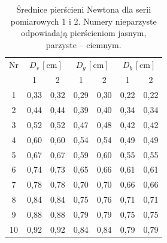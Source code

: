 \documentclass[12pt]{article}
\begin{document}
\begin{table}[H]
	\centering
	\begin{tabular}{c|cc|cc|cc}
		\toprule
		Nr & \multicolumn{2}{c|}{\(D_r\,[\mathrm{cm}]\)} & \multicolumn{2}{c|}{\(D_g\,[\mathrm{cm}]\)} & \multicolumn{2}{c}{\(D_b\,[\mathrm{cm}]\)}                            \\
		   & 1                                           & 2                                           & 1                                          & 2      & 1      & 2      \\
		\midrule
		1  & 0{,}33                                      & 0{,}32                                      & 0{,}29                                     & 0{,}30 & 0{,}22 & 0{,}22 \\
		2  & 0{,}44                                      & 0{,}44                                      & 0{,}39                                     & 0{,}40 & 0{,}34 & 0{,}34 \\
		3  & 0{,}52                                      & 0{,}52                                      & 0{,}47                                     & 0{,}48 & 0{,}42 & 0{,}42 \\
		4  & 0{,}60                                      & 0{,}60                                      & 0{,}54                                     & 0{,}54 & 0{,}49 & 0{,}49 \\
		5  & 0{,}67                                      & 0{,}67                                      & 0{,}59                                     & 0{,}60 & 0{,}55 & 0{,}55 \\
		6  & 0{,}74                                      & 0{,}73                                      & 0{,}65                                     & 0{,}66 & 0{,}61 & 0{,}61 \\
		7  & 0{,}78                                      & 0{,}78                                      & 0{,}70                                     & 0{,}70 & 0{,}66 & 0{,}66 \\
		8  & 0{,}84                                      & 0{,}84                                      & 0{,}75                                     & 0{,}76 & 0{,}71 & 0{,}71 \\
		9  & 0{,}88                                      & 0{,}88                                      & 0{,}79                                     & 0{,}79 & 0{,}75 & 0{,}75 \\
		10 & 0{,}92                                      & 0{,}92                                      & 0{,}84                                     & 0{,}84 & 0{,}79 & 0{,}79 \\
		\bottomrule
	\end{tabular}
	\caption{Średnice pierścieni Newtona dla serii pomiarowych 1 i 2. Numery nieparzyste odpowiadają pierścieniom jasnym, parzyste – ciemnym.}
	\label{tab:rgb_measurements}
\end{table}
\end{document}
